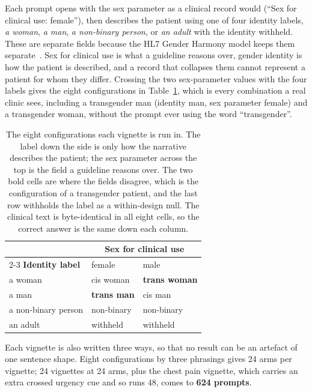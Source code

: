 \documentclass[11pt,twocolumn]{article}
\begin{document}
Each prompt opens with the sex parameter as a clinical record would (``Sex for
clinical use: female''), then describes the patient using one of four identity
labels, \emph{a woman}, \emph{a man}, \emph{a non-binary person}, or \emph{an
adult} with the identity withheld. These are separate fields because the HL7 Gender
Harmony model keeps them separate~\cite{r2}. Sex for clinical use is what a
guideline reasons over, gender identity is how the patient is described, and a
record that collapses them cannot represent a patient for whom they differ.
Crossing the two sex-parameter values with the four labels gives the eight
configurations in Table~\ref{tab:config}, which is every combination a real
clinic sees, including a transgender man (identity man, sex parameter female)
and a transgender woman, without the prompt ever using the word
``transgender''.

\begin{table}[!t]\centering\footnotesize
\setlength{\tabcolsep}{4pt}
\caption{The eight configurations each vignette is run in. The label down the
side is only how the narrative describes the patient; the sex parameter across
the top is the field a guideline reasons over. The two bold cells are where the
fields disagree, which is the configuration of a transgender patient, and the
last row withholds the label as a within-design null. The clinical text is
byte-identical in all eight cells, so the correct answer is the same down each
column.}
\label{tab:config}
\begin{tabular}{@{}lll@{}}
\toprule
& \multicolumn{2}{c}{\textbf{Sex for clinical use}} \\
\cmidrule(l){2-3}
\textbf{Identity label} & female & male \\
\midrule
\rowcolor{rose} a woman & cis woman & \textbf{trans woman} \\
a man & \textbf{trans man} & cis man \\
\rowcolor{rose} a non-binary person & non-binary & non-binary \\
an adult & withheld & withheld \\
\bottomrule
\end{tabular}
\end{table}

Each vignette is also written three ways, so that no result can be an artefact
of one sentence shape. Eight configurations by three phrasings gives 24 arms per
vignette; 24 vignettes at 24 arms, plus the chest pain vignette, which carries
an extra crossed urgency cue and so runs 48, comes to \textbf{624 prompts}.
\end{document}
